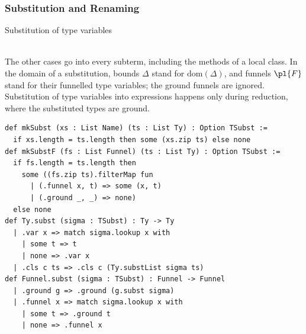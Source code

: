 \subsubsection{Substitution and Renaming}

\begin{cmp}{Substitution of type variables}
\begin{paperside}
\\[1ex]
The other cases go into every subterm, including the methods of a local class.
In the domain of a substitution, bounds $\Delta$ stand for $\mathrm{dom}(\Delta)$, and funnels $\pl{F}$ stand for their funnelled type variables; the ground funnels are ignored.
Substitution of type variables into expressions happens only during reduction, where the substituted types are ground.
\end{paperside}
\begin{leanside}
\begin{lstlisting}[style=leanside]
def mkSubst (xs : List Name) (ts : List Ty) : Option TSubst :=
  if xs.length = ts.length then some (xs.zip ts) else none
def mkSubstF (fs : List Funnel) (ts : List Ty) : Option TSubst :=
  if fs.length = ts.length then
    some ((fs.zip ts).filterMap fun
      | (.funnel x, t) => some (x, t)
      | (.ground _, _) => none)
  else none
def Ty.subst (sigma : TSubst) : Ty -> Ty
  | .var x => match sigma.lookup x with
    | some t => t
    | none => .var x
  | .cls c ts => .cls c (Ty.substList sigma ts)
def Funnel.subst (sigma : TSubst) : Funnel -> Funnel
  | .ground g => .ground (g.subst sigma)
  | .funnel x => match sigma.lookup x with
    | some t => .ground t
    | none => .funnel x
\end{lstlisting}
\end{leanside}
\end{cmp}


